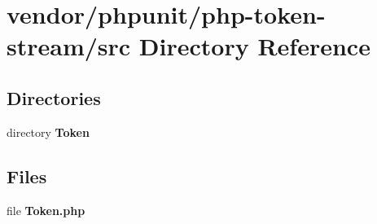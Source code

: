 \section{vendor/phpunit/php-\/token-\/stream/src Directory Reference}
\label{dir_fe664f935d71301b8d9f5c8e27b0dcaa}
\subsection*{Directories}
\begin{DoxyCompactItemize}
\item 
directory {\bf Token}
\end{DoxyCompactItemize}
\subsection*{Files}
\begin{DoxyCompactItemize}
\item 
file {\bf Token.\+php}
\end{DoxyCompactItemize}
